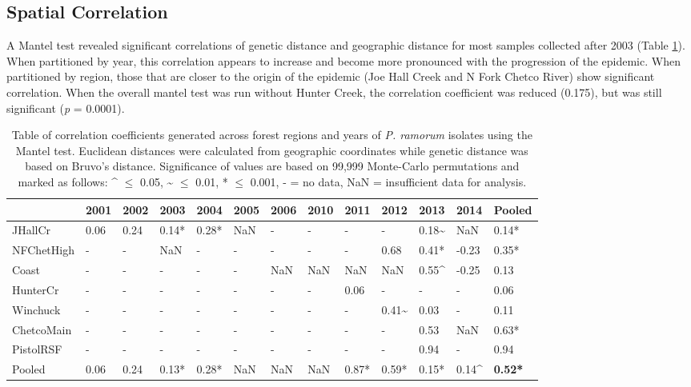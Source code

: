 \documentclass[double,12pt]{beavtex}
\begin{document}
  \subsection{Spatial Correlation}\label{spatial-correlation}
  
  A Mantel test revealed significant correlations of genetic distance and
  geographic distance for most samples collected after 2003 (Table
  \ref{tab:ramorum3}). When partitioned by year, this correlation appears
  to increase and become more pronounced with the progression of the
  epidemic. When partitioned by region, those that are closer to the
  origin of the epidemic (Joe Hall Creek and N Fork Chetco River) show
  significant correlation. When the overall mantel test was run without
  Hunter Creek, the correlation coefficient was reduced (0.175), but was
  still significant (\emph{p} = 0.0001).
  
  \begin{table}
  \centering
  \begin{tabular}{@{}lllllllllllll@{}}
  \toprule
  & \textbf{2001} & \textbf{2002} & \textbf{2003} & \textbf{2004} &
  \textbf{2005} & \textbf{2006} & \textbf{2010} & \textbf{2011} &
  \textbf{2012} & \textbf{2013} & \textbf{2014} &
  \textbf{Pooled}\tabularnewline
  \midrule
  JHallCr & 0.06 & 0.24 & 0.14* & 0.28* & NaN & - & - & - & - & 0.18\~{}
  & NaN & 0.14*\tabularnewline
  NFChetHigh & - & - & NaN & - & - & - & - & - & 0.68 & 0.41* & -0.23 &
  0.35*\tabularnewline
  Coast & - & - & - & - & - & NaN & NaN & NaN & NaN & 0.55\^{} & -0.25 &
  0.13\tabularnewline
  HunterCr & - & - & - & - & - & - & - & 0.06 & - & - & - &
  0.06\tabularnewline
  Winchuck & - & - & - & - & - & - & - & - & 0.41\~{} & 0.03 & - &
  0.11\tabularnewline
  ChetcoMain & - & - & - & - & - & - & - & - & - & 0.53 & NaN &
  0.63*\tabularnewline
  PistolRSF & - & - & - & - & - & - & - & - & - & 0.94 & - &
  0.94\tabularnewline
  Pooled & 0.06 & 0.24 & 0.13* & 0.28* & NaN & NaN & NaN & 0.87* &
  0.59* & 0.15* & 0.14\^{} & \textbf{0.52*}\tabularnewline
  \bottomrule
  \end{tabular}
  \caption[Table of correlation coefficients generated across
  forest regions and years of \emph{P. ramorum} isolates using the Mantel
  test.]{Table of correlation coefficients generated across
  forest regions and years of \emph{P. ramorum} isolates using the Mantel
  test. Euclidean distances were calculated from geographic coordinates
  while genetic distance was based on Bruvo's distance. Significance of
  values are based on 99,999 Monte-Carlo permutations and marked as
  follows: \^{} $\leq$ 0.05, \~{} $\leq$ 0.01, * $\leq$ 0.001, - = no data, NaN =
  insufficient data for analysis.}
  \label{tab:ramorum3}
  \end{table}
  
\end{document}
